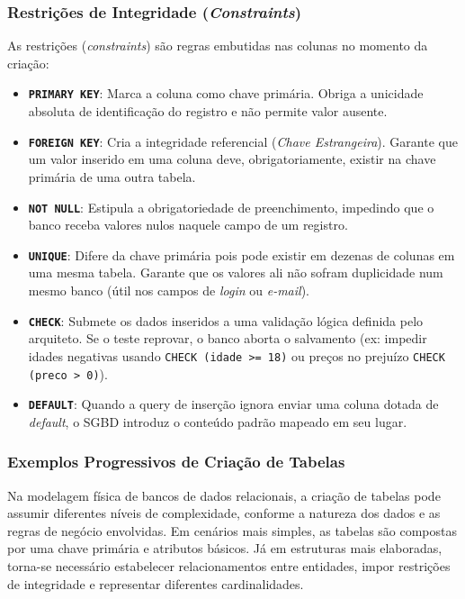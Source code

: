 \subsubsection{Restrições de Integridade (\textit{Constraints})}

As restrições (\textit{constraints}) são regras embutidas nas colunas no momento da criação:

\begin{itemize}
    \item \textbf{\texttt{PRIMARY KEY}}: Marca a coluna como chave primária. Obriga a unicidade absoluta de identificação do registro e não permite valor ausente.
    \item \textbf{\texttt{FOREIGN KEY}}: Cria a integridade referencial (\textit{Chave Estrangeira}). Garante que um valor inserido em uma coluna deve, obrigatoriamente, existir na chave primária de uma outra tabela.
    \item \textbf{\texttt{NOT NULL}}: Estipula a obrigatoriedade de preenchimento, impedindo que o banco receba valores nulos naquele campo de um registro.
    \item \textbf{\texttt{UNIQUE}}: Difere da chave primária pois pode existir em dezenas de colunas em uma mesma tabela. Garante que os valores ali não sofram duplicidade num mesmo banco (útil nos campos de \textit{login} ou \textit{e-mail}).
    \item \textbf{\texttt{CHECK}}: Submete os dados inseridos a uma validação lógica definida pelo arquiteto. Se o teste reprovar, o banco aborta o salvamento (ex: impedir idades negativas usando \texttt{CHECK (idade >= 18)} ou preços no prejuízo \texttt{CHECK (preco > 0)}).
    \item \textbf{\texttt{DEFAULT}}: Quando a query de inserção ignora enviar uma coluna dotada de \textit{default}, o SGBD introduz o conteúdo padrão mapeado em seu lugar.
\end{itemize}

\subsubsection{Exemplos Progressivos de Criação de Tabelas}

Na modelagem física de bancos de dados relacionais, a criação de tabelas pode assumir diferentes níveis de complexidade, conforme a natureza dos dados e as regras de negócio envolvidas. Em cenários mais simples, as tabelas são compostas por uma chave primária e atributos básicos. Já em estruturas mais elaboradas, torna-se necessário estabelecer relacionamentos entre entidades, impor restrições de integridade e representar diferentes cardinalidades.


